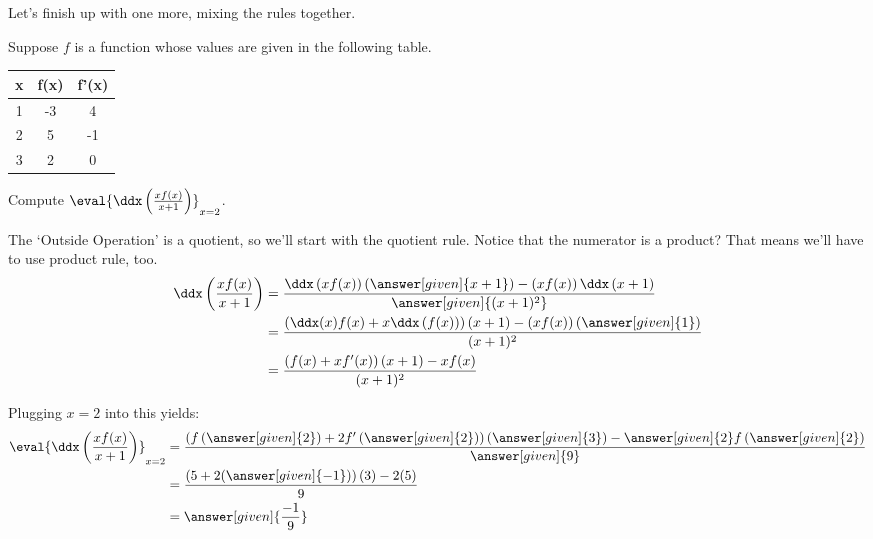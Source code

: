\documentclass{ximera}
\begin{document}
Let's finish up with one more, mixing the rules together.
\begin{example}
	Suppose $f$ is a function whose values are given in the following table.
	\begin{center}
		\begin{tabular}{c c c}
			\hline \hline
			x & f(x) & f'(x) \\ 
			\hline
			1 & -3 & 4\\
			2 & 5 & -1\\
			3 & 2 & 0\\
			\hline
		\end{tabular}		
	\end{center}
		
	Compute $\eval{ \ddx\left( \frac{x f(x)}{x+1} \right)}_{x=2}$.
	\begin{explanation}
		The `Outside Operation' is a quotient, so we'll start with the quotient rule.  Notice that the numerator is a product?  That means we'll have to use product rule, too.
		\begin{align*}
			\ddx\left( \frac{x f(x)}{x+1} \right) &= \frac{\ddx\left(x f(x)\right) \left(\answer[given]{x+1}\right) - \left( x f(x) \right) \ddx \left(x+1\right)}{\answer[given]{(x+1)^2}}\\
				&= \frac{\left( \ddx(x) f(x) + x\ddx\left(f(x)\right) \right) (x+1) - \left( x f(x) \right) \left( \answer[given]{1}\right)}{(x+1)^2}\\
				&= \frac{\left( f(x) + x f'(x) \right) (x+1) - x f(x)}{(x+1)^2}		
		\end{align*}
		
		Plugging $x=2$ into this yields:
		\begin{align*}
			\eval{ \ddx\left( \frac{x f(x)}{x+1} \right)}_{x=2} 
				&= \frac{\left( f\left(\answer[given]{2}\right) + 2 f'\left(\answer[given]{2}\right) \right) \left(\answer[given]{3}\right) - \answer[given]{2} f\left(\answer[given]{2}\right)}{\answer[given]{9}} \\
				&= \frac{\left( 5 + 2 (\answer[given]{-1})\right) (3) - 2 (5)}{9} \\
				&= \answer[given]{\frac{-1}{9}}
		\end{align*}
	\end{explanation}
\end{example}
\end{document}
